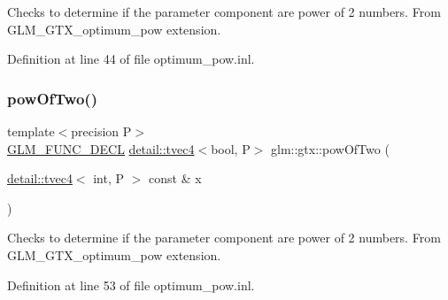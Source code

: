 Checks to determine if the parameter component are power of 2 numbers. From G\+L\+M\+\_\+\+G\+T\+X\+\_\+optimum\+\_\+pow extension. 

Definition at line 44 of file optimum\+\_\+pow.\+inl.

\mbox{\label{group__gtx__optimum__pow_ga3471bc7e9e580f6b76647cb5156135cc}} 
\subsubsection{\texorpdfstring{pow\+Of\+Two()}{powOfTwo()}\hspace{0.1cm}{\footnotesize\ttfamily [4/4]}}
{\footnotesize\ttfamily template$<$precision P$>$ \\
\hyperlink{setup_8hpp_ab2d052de21a70539923e9bcbf6e83a51}{G\+L\+M\+\_\+\+F\+U\+N\+C\+\_\+\+D\+E\+CL} \hyperlink{structglm_1_1detail_1_1tvec4}{detail\+::tvec4}$<$bool, P$>$ glm\+::gtx\+::pow\+Of\+Two (\begin{DoxyParamCaption}\item[{\hyperlink{structglm_1_1detail_1_1tvec4}{detail\+::tvec4}$<$ int, P $>$ const \&}]{x }\end{DoxyParamCaption})}

Checks to determine if the parameter component are power of 2 numbers. From G\+L\+M\+\_\+\+G\+T\+X\+\_\+optimum\+\_\+pow extension. 

Definition at line 53 of file optimum\+\_\+pow.\+inl.


